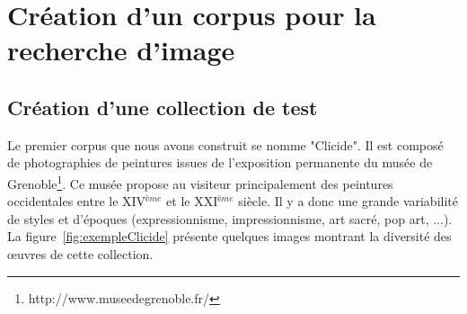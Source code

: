\chapter{Création d'un corpus pour la recherche d'image}
\label{chap:corpus}








\section{Création d'une collection de test}

Le premier corpus que nous avons construit se nomme "Clicide". Il est composé de photographies de peintures issues de l'exposition permanente du musée de Grenoble\footnote{http://www.museedegrenoble.fr/}. Ce musée propose au visiteur principalement des peintures occidentales entre le XIV$^{\text{\`e}me}$ et le XXI$^{\text{\`e}me}$ siècle. Il y a donc une grande variabilité de styles et d'époques (expressionnisme, impressionnisme, art sacré, pop art, ...). La figure~\ref{fig:exempleClicide} présente quelques images montrant la diversité des œuvres de cette collection.


